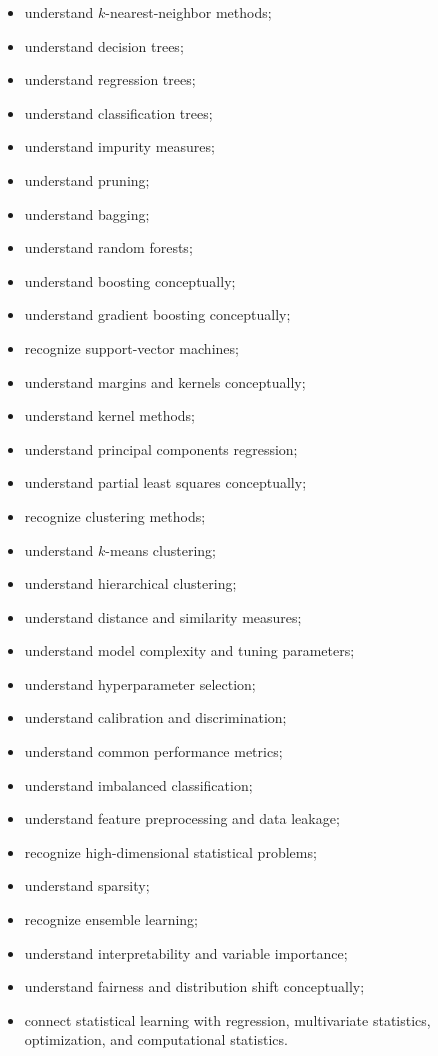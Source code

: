 {\begin{itemize}
    \item understand \(k\)-nearest-neighbor methods;
    \item understand decision trees;
    \item understand regression trees;
    \item understand classification trees;
    \item understand impurity measures;
    \item understand pruning;
    \item understand bagging;
    \item understand random forests;
    \item understand boosting conceptually;
    \item understand gradient boosting conceptually;
    \item recognize support-vector machines;
    \item understand margins and kernels conceptually;
    \item understand kernel methods;
    \item understand principal components regression;
    \item understand partial least squares conceptually;
    \item recognize clustering methods;
    \item understand \(k\)-means clustering;
    \item understand hierarchical clustering;
    \item understand distance and similarity measures;
    \item understand model complexity and tuning parameters;
    \item understand hyperparameter selection;
    \item understand calibration and discrimination;
    \item understand common performance metrics;
    \item understand imbalanced classification;
    \item understand feature preprocessing and data leakage;
    \item recognize high-dimensional statistical problems;
    \item understand sparsity;
    \item recognize ensemble learning;
    \item understand interpretability and variable importance;
    \item understand fairness and distribution shift conceptually;
    \item connect statistical learning with regression, multivariate
          statistics, optimization, and computational statistics.
\end{itemize}
}

